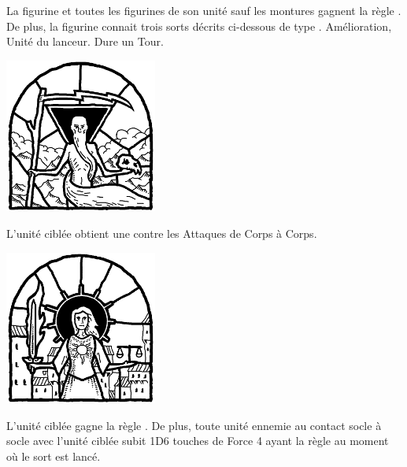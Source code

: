 \armyspecialruleentry{\blessings}

La figurine et toutes les figurines de son unité sauf les montures gagnent la règle \hatred{}. De plus, la figurine connait trois sorts décrits ci-dessous de type . Amélioration, Unité du lanceur. Dure un Tour.
\begin{multicols}{3}
\raggedcolumns
\begin{center}
	\includegraphics[width=5cm]{pics/ullorsblessing.png}
	
	\vspace*{5pt}{\Largerfontsize\antiquefont\ullorsblessing{}}
	
	\vspace*{5pt}L'unité ciblée obtient une  contre les Attaques de Corps à Corps.
\end{center}

\vspace*{\fill}
\columnbreak

\begin{center}
	\includegraphics[width=5cm]{pics/sunnasblessing.png}
	
	\vspace*{5pt}{\Largerfontsize\antiquefont\sunnasblessing{}}
	
	\vspace*{5pt}L'unité ciblée gagne la règle \flamingattacks{}. De plus, toute unité ennemie au contact socle à socle avec l'unité ciblée subit 1D6 touches de Force 4 ayant la règle \flamingattacks{} au moment où le sort est lancé.
\end{center}


\end{multicols}
